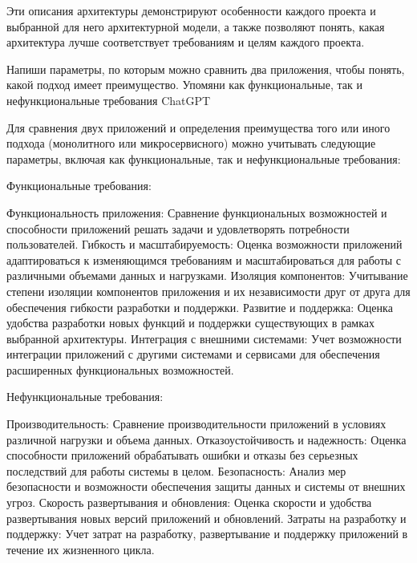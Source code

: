 Эти описания архитектуры демонстрируют особенности каждого проекта и выбранной для него архитектурной модели, а также позволяют понять, какая архитектура лучше соответствует требованиям и целям каждого проекта.
















Напиши параметры, по которым можно сравнить два приложения, чтобы понять, какой подход имеет преимущество. Упомяни как функциональные, так и нефункциональные требования
ChatGPT


Для сравнения двух приложений и определения преимущества того или иного подхода (монолитного или микросервисного) можно учитывать следующие параметры, включая как функциональные, так и нефункциональные требования:

Функциональные требования:

    Функциональность приложения: Сравнение функциональных возможностей и способности приложений решать задачи и удовлетворять потребности пользователей.
    Гибкость и масштабируемость: Оценка возможности приложений адаптироваться к изменяющимся требованиям и масштабироваться для работы с различными объемами данных и нагрузками.
    Изоляция компонентов: Учитывание степени изоляции компонентов приложения и их независимости друг от друга для обеспечения гибкости разработки и поддержки.
    Развитие и поддержка: Оценка удобства разработки новых функций и поддержки существующих в рамках выбранной архитектуры.
    Интеграция с внешними системами: Учет возможности интеграции приложений с другими системами и сервисами для обеспечения расширенных функциональных возможностей.

Нефункциональные требования:

    Производительность: Сравнение производительности приложений в условиях различной нагрузки и объема данных.
    Отказоустойчивость и надежность: Оценка способности приложений обрабатывать ошибки и отказы без серьезных последствий для работы системы в целом.
    Безопасность: Анализ мер безопасности и возможности обеспечения защиты данных и системы от внешних угроз.
    Скорость развертывания и обновления: Оценка скорости и удобства развертывания новых версий приложений и обновлений.
    Затраты на разработку и поддержку: Учет затрат на разработку, развертывание и поддержку приложений в течение их жизненного цикла.


